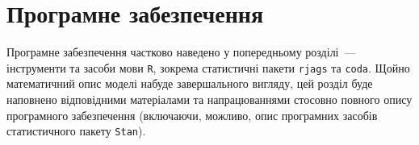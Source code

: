 \section{Програмне забезпечення}

Програмне забезпечення частково наведено у попередньому розділі~--- інструменти та засоби мови \texttt{R}, зокрема статистичні пакети \texttt{rjags} та \texttt{coda}. Щойно математичний опис моделі набуде завершального вигляду, цей розділ буде наповнено відповідними матеріалами та напрацюваннями стосовно повного опису програмного забезпечення (включаючи, можливо, опис програмних засобів статистичного пакету \texttt{Stan}).